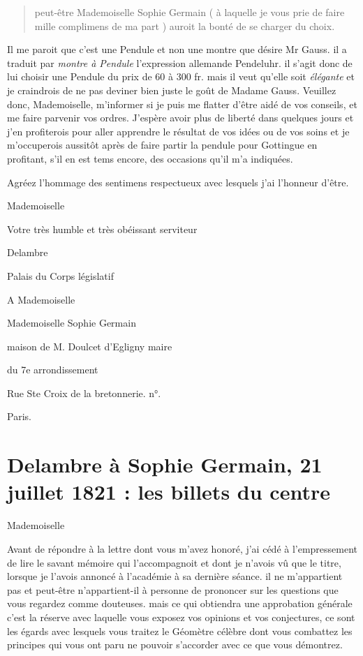 \documentclass[11pt,a4paper]{article}
\begin{document}
\begin{quote}
peut-être Mademoiselle Sophie Germain ( à laquelle je vous prie de faire
mille complimens de ma part ) auroit la bonté de se charger du choix.
\end{quote}

Il me paroit que c'est une Pendule et non une montre que désire Mr Gauss. il
a traduit par \emph{montre à Pendule} l'expression allemande Pendeluhr. il
s'agit donc de lui choisir une Pendule du prix de 60 à 300 fr. mais il veut
qu'elle soit \emph{élégante} et je craindrois de ne pas deviner bien juste le
goût de Madame Gauss. Veuillez donc, Mademoiselle, m'informer si je puis me
flatter d'être aidé de vos conseils, et me faire parvenir vos ordres.
J'espère avoir plus de liberté dans quelques jours et j'en profiterois pour
aller apprendre le résultat de vos idées ou de vos soins et je m'occuperois
aussitôt après de faire partir la pendule pour Gottingue en profitant, s'il
en est tems encore, des occasions qu'il m'a indiquées.

Agréez l'hommage des sentimens respectueux avec lesquels j'ai l'honneur
d'être.

Mademoiselle

Votre très humble et très obéissant serviteur

Delambre

Palais du Corps législatif


A Mademoiselle

Mademoiselle Sophie Germain

maison de M. Doulcet d'Egligny maire

du 7e arrondissement

Rue Ste Croix de la bretonnerie. n°. 

Paris.


\section{Delambre à Sophie Germain, 21 juillet 1821 : les billets du centre}

Mademoiselle

Avant de répondre à la lettre dont vous m'avez honoré, j'ai cédé à
l'empressement de lire le savant mémoire qui l'accompagnoit et dont je
n'avois vû que le titre, lorsque je l'avois annoncé à l'académie à sa
dernière séance. il ne m'appartient pas et peut-être n'appartient-il à
personne de prononcer sur les questions que vous regardez comme douteuses.
mais ce qui obtiendra une approbation générale c'est la réserve avec laquelle
vous exposez vos opinions et vos conjectures, ce sont les égards avec
lesquels vous traitez le Géomètre célèbre dont vous combattez les principes
qui vous ont paru ne pouvoir s'accorder avec ce que vous démontrez.
\end{document}
